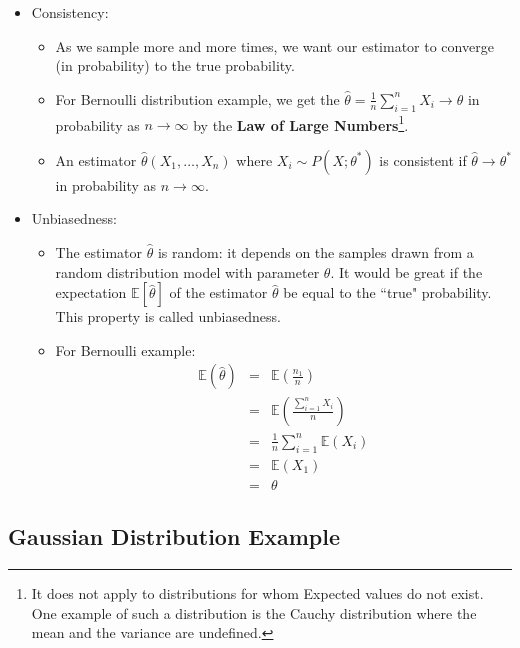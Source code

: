 \documentclass[letterpaper,10pt]{article}
\begin{document}
\begin{itemize}
	\item Consistency:
	\begin{itemize}
		\item As we sample more and more times, we want our estimator to converge (in probability) to the true probability.
		\item For Bernoulli distribution example, we get the $\hat{\theta}=\frac{1}{n}\sum_{i=1}^{n}{X_i} \rightarrow \theta$ in probability as $n \rightarrow \infty$ by the \textbf{Law of Large Numbers}\footnote{It does not apply to distributions for whom Expected values do not exist. One example of such a distribution is the Cauchy distribution where the mean and the variance are undefined.}.
		\item An estimator $\hat{\theta}(X_1,\dots,X_n)$ where $X_i\sim P(X;\theta^*)$ is consistent if $\hat{\theta}\rightarrow \theta^*$ in probability as $n\rightarrow \infty$.
	\end{itemize}
	\item Unbiasedness:
	\begin{itemize}
		\item The estimator $\hat{\theta}$ is random: it depends on the samples drawn from a random distribution model with parameter $\theta$. It would be great if the expectation $\mathbb{E}[\hat{\theta}]$ of the estimator $\hat{\theta}$ be equal to the ``true" probability. This property is called unbiasedness.
		\item For Bernoulli example:
		\begin{equation}
		\begin{array}{rcl}
		\mathbb{E}(\hat{\theta}) & = & \mathbb{E}(\frac{n_1}{n}) \\
								 & = & \mathbb{E}(\frac{\sum_{i=1}^{n}X_i}{n}) \\
								 & = & \frac{1}{n}\sum_{i=1}^{n}{\mathbb{E}(X_i)} \\
								 & = & \mathbb{E}(X_1) \\
								 & = & \theta
		\end{array}
		\end{equation}
	\end{itemize}
\end{itemize}

\subsection{Gaussian Distribution Example}
\end{document}

